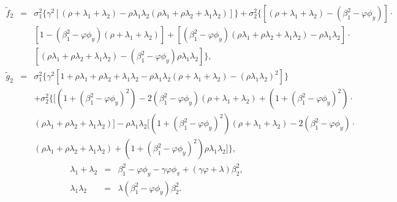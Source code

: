 \begin{eqnarray*}
\widetilde{f}_2&=&\sigma_1^2\Big\{\gamma^2[(\rho+\lambda_1+\lambda_2)-\rho\lambda_1\lambda_2(\rho\lambda_1+\rho\lambda_2+\lambda_1\lambda_2)]\Big\}+\sigma_2^2\Big\{[(\rho+\lambda_1+\lambda_2)-(\beta_1^2-\varphi\phi_y)]\cdot\\
&&[1-(\beta_1^2-\varphi\phi_y)(\rho+\lambda_1+\lambda_2)]+[(\beta_1^2-\varphi\phi_y)(\rho\lambda_1+\rho\lambda_2+\lambda_1\lambda_2)-\rho\lambda_1\lambda_2]\cdot\\
&&[(\rho\lambda_1+\rho\lambda_2+\lambda_1\lambda_2)-(\beta_1^2-\varphi\phi_y)\rho\lambda_1\lambda_2]\Big\},\\
\widetilde{g}_2&=&\sigma_1^2\Big\{\gamma^2[1+\rho\lambda_1+\rho\lambda_2+\lambda_1\lambda_2-\rho\lambda_1\lambda_2(\rho+\lambda_1+\lambda_2)-(\rho\lambda_1\lambda_2)^2]\Big\}\\
&&+\sigma_2^2\Big\{[(1+(\beta_1^2-\varphi\phi_y)^2)-2(\beta_1^2-\varphi\phi_y)(\rho+\lambda_1+\lambda_2)+(1+(\beta_1^2-\varphi\phi_y)^2)\cdot\\
&&(\rho\lambda_1+\rho\lambda_2+\lambda_1\lambda_2)]-\rho\lambda_1\lambda_2[(1+(\beta_1^2-\varphi\phi_y)^2)(\rho+\lambda_1+\lambda_2)-2(\beta_1^2-\varphi\phi_y)\cdot\\
&&(\rho\lambda_1+\rho\lambda_2+\lambda_1\lambda_2)+(1+(\beta_1^2-\varphi\phi_y)^2)\rho\lambda_1\lambda_2]\Big\},
\end{eqnarray*}
\begin{eqnarray*}
\lambda_1+\lambda_2&=&\beta_1^2-\varphi\phi_y-\gamma\varphi\phi_\pi+(\gamma\varphi+\lambda)\beta_2^2,\\
\lambda_1\lambda_2&=&\lambda(\beta_1^2-\varphi\phi_y)\beta_2^2.
\end{eqnarray*}

